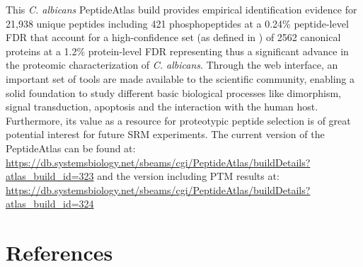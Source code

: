 This \textit{C. albicans} PeptideAtlas build provides empirical identification
 evidence for 21,938 unique peptides including 421
phosphopeptides at a 0.24\% peptide-level FDR that account for a
high-confidence set (as defined in \citep{Farrah2011}) of 2562 canonical proteins
at a 1.2\% protein-level FDR representing thus a significant
advance in the proteomic characterization of \textit{C. albicans}.
Through the web interface, an important set of tools are
made available to the scientific community, enabling a solid
foundation to study different basic biological processes like
dimorphism, signal transduction, apoptosis and the interaction
with the human host. Furthermore, its value as a resource for
proteotypic peptide selection is of great potential interest for
future SRM experiments.
The current version of the PeptideAtlas can be found
at: 
\href{https://db.systemsbiology.net/sbeams/cgi/PeptideAtlas/buildDetails?atlas_build_id=323}{https://db.systemsbiology.net/sbeams/cgi/PeptideAtlas/buildDetails?atlas\_build\_id=323}
and the version including PTM results at:\newline{}
\href{https://db.systemsbiology.net/sbeams/cgi/PeptideAtlas/buildDetails?atlas_build_id=324}{https://db.systemsbiology.net/sbeams/cgi/PeptideAtlas/buildDetails?atlas\_build\_id=324}


\section*{References}

